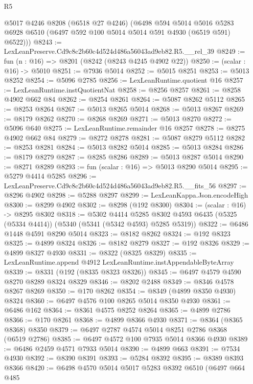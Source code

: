 \begin{lexlean}{R5}
\begin{coremodule}
      @5017
      @4246
      @8208
      (@6518 @27 @4246)
      (@6498
        @594
        @5014
        @5016
        @5283
        @6928
        @6510
        (@6497 @592 @100 @5014 @5014 @591 @4930 (@6519 @591) @6522)))
@8243 := LexLeanPreserve.Cd9c8c2b60c4d524d486a56043ad9eb82.R5.__rel_39
@8249 := fun (n : @16) => @8201 (@8242 (@8243 @4245 @4902 @22))
@8250 := (scalar : @16) -> @5010
@8251 := @7936 @5014
@8252 := @5015 @8251
@8253 := @5013 @8252
@8254 := @5096 @2785
@8256 := LexLeanRuntime.quotient @16
@8257 := LexLeanRuntime.instQuotientNat
@8258 := @8256 @8257
@8261 := @8258 @4902 @662 @84
@8262 := @8254 @8261
@8264 := @5087 @8262 @5112
@8265 := @8253 @8264
@8267 := @5013 @8265 @5014
@8268 := @5013 @8267
@8269 := @8179 @8262
@8270 := @8268 @8269
@8271 := @5013 @8270
@8272 := @5096 @640
@8275 := LexLeanRuntime.remainder @16 @8257
@8278 := @8275 @4902 @662 @84
@8279 := @8272 @8278
@8281 := @5087 @8279 @5112
@8282 := @8253 @8281
@8284 := @5013 @8282 @5014
@8285 := @5013 @8284
@8286 := @8179 @8279
@8287 := @8285 @8286
@8289 := @5013 @8287 @5014
@8290 := @8271 @8289
@8293 := fun (scalar : @16) => @5013 @8290 @5014
@8295 := @5279 @4414 @5285
@8296 := LexLeanPreserve.Cd9c8c2b60c4d524d486a56043ad9eb82.R5.__fits_56
@8297 := @8296 @4902
@8298 := @5288 @8297
@8299 := LexLeanKappa.Json.encodeHigh
@8300 := @8299 @4902
@8302 := @8298 (@192 @8300)
@8304 := (scalar : @16) -> @8295 @8302
@8318 := @5302
    @4414
    @5285
    @8302
    @4593
    @6435
    (@5325 (@5334 @4414))
    (@5340 (@5341 (@5342 @4593) @5285 @5319))
@8322 := @6486 @1448 @4591 @8290 @5014
@8323 := @8182 @8262
@8324 := @192 @8323
@8325 := @4899 @8324
@8326 := @8182 @8279
@8327 := @192 @8326
@8329 := @4899 @8327 @4930
@8331 := @8322 (@8325 @8329)
@8335 := LexLeanRuntime.append @4912 LexLeanRuntime.instAppendableByteArray
@8339 := @8331 (@192 (@8335 @8323 @8326))
@8345 := @6497 @4579 @4590 @8270 @8289 @8324 @8329
@8346 := @8202 @2488
@8349 := @8346 @4578 @8267 @8269
@8350 := @170 @8262
@8354 := @8349 (@4899 @8350 @4930) @8324
@8360 := @6497 @4576 @100 @8265 @5014 @8350 @4930
@8361 := @6486 @162
@8364 := @8361 @4575 @8252 @8264
@8365 := @4899 @2786
@8366 := @170 @8261
@8368 := @4899 @8366 @4930
@8371 := @8364 (@8365 @8368) @8350
@8379 := @6497 @2787 @4574 @5014 @8251 @2786 @8368 (@6519 @2786)
@8385 := @6497 @4572 @100 @7935 @5014 @8366 @4930
@8389 := @6486 @2459 @4571 @7933 @5014
@8390 := @4899 @663
@8391 := @7534 @4930
@8392 := @8390 @8391
@8393 := @5284 @8392
@8395 := @8389 @8393 @8366
@8420 := @6498
    @4570
    @5014
    @5017
    @5283
    @8392
    @6510
    (@6497
      @664
      @485

\end{coremodule}
\end{lexlean}
